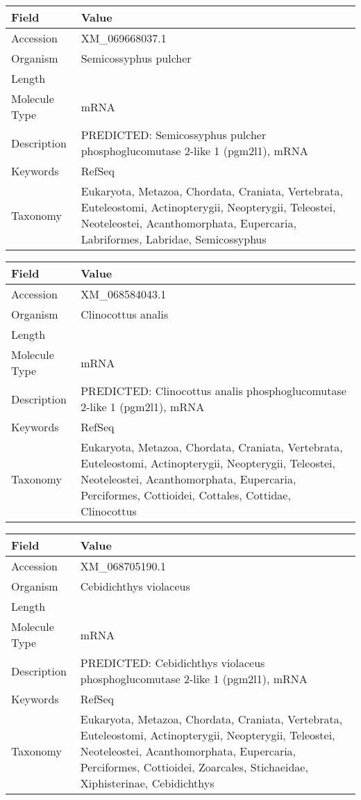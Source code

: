 \documentclass[10pt]{article}
\begin{document}
{\footnotesize
\begin{longtable}{>{\raggedright\arraybackslash}p{4.5cm} >{\raggedright\arraybackslash}p{11.5cm}}
\textbf{Field} & \textbf{Value} \\
\hline
Accession & XM\_069668037.1 \\
Organism & Semicossyphus pulcher \\
Length & 3361 \\
Molecule Type & mRNA \\
Description & PREDICTED: Semicossyphus pulcher phosphoglucomutase 2-like 1 (pgm2l1), mRNA \\
Keywords & RefSeq \\
Taxonomy & Eukaryota, Metazoa, Chordata, Craniata, Vertebrata, Euteleostomi, Actinopterygii, Neopterygii, Teleostei, Neoteleostei, Acanthomorphata, Eupercaria, Labriformes, Labridae, Semicossyphus \\
\end{longtable}
}

{\footnotesize
\begin{longtable}{>{\raggedright\arraybackslash}p{4.5cm} >{\raggedright\arraybackslash}p{11.5cm}}
\textbf{Field} & \textbf{Value} \\
\hline
Accession & XM\_068584043.1 \\
Organism & Clinocottus analis \\
Length & 3066 \\
Molecule Type & mRNA \\
Description & PREDICTED: Clinocottus analis phosphoglucomutase 2-like 1 (pgm2l1), mRNA \\
Keywords & RefSeq \\
Taxonomy & Eukaryota, Metazoa, Chordata, Craniata, Vertebrata, Euteleostomi, Actinopterygii, Neopterygii, Teleostei, Neoteleostei, Acanthomorphata, Eupercaria, Perciformes, Cottioidei, Cottales, Cottidae, Clinocottus \\
\end{longtable}
}

{\footnotesize
\begin{longtable}{>{\raggedright\arraybackslash}p{4.5cm} >{\raggedright\arraybackslash}p{11.5cm}}
\textbf{Field} & \textbf{Value} \\
\hline
Accession & XM\_068705190.1 \\
Organism & Cebidichthys violaceus \\
Length & 2962 \\
Molecule Type & mRNA \\
Description & PREDICTED: Cebidichthys violaceus phosphoglucomutase 2-like 1 (pgm2l1), mRNA \\
Keywords & RefSeq \\
Taxonomy & Eukaryota, Metazoa, Chordata, Craniata, Vertebrata, Euteleostomi, Actinopterygii, Neopterygii, Teleostei, Neoteleostei, Acanthomorphata, Eupercaria, Perciformes, Cottioidei, Zoarcales, Stichaeidae, Xiphisterinae, Cebidichthys \\
\end{longtable}
}
\end{document}
